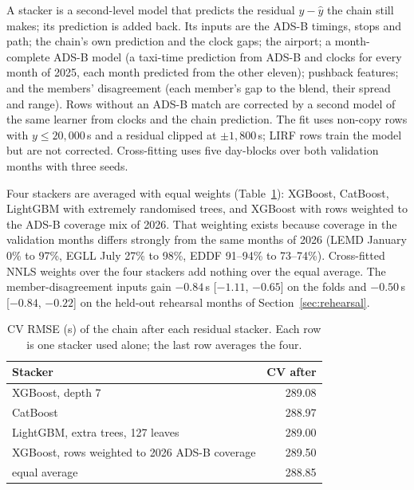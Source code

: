 \documentclass[
  manuscript=article,
  layout=preprint,
  year=2026,
  volume=x,
]{extra/joas}
\begin{document}
A stacker \cite{wolpert1992stacked} is a second-level model that predicts the residual $y - \hat{y}$ the chain still makes; its
prediction is added back. Its inputs are the ADS-B timings, stops and path; the chain's own prediction and the clock gaps; the airport;
a month-complete ADS-B model (a taxi-time prediction from ADS-B and clocks for every month of 2025, each month predicted from the other
eleven); pushback features; and the members' disagreement (each member's gap to the blend, their spread and range). Rows without an ADS-B
match are corrected by a second model of the same learner from clocks and the chain prediction. The fit uses non-copy rows with
$y \le 20{,}000$\,s and a residual clipped at $\pm 1{,}800$\,s; LIRF rows train the model but are not corrected. Cross-fitting uses five
day-blocks over both validation months with three seeds.

Four stackers are averaged with equal weights (Table~\ref{tb:stackers}): XGBoost, CatBoost, LightGBM \cite{ke2017lightgbm} with extremely
randomised trees, and XGBoost with rows weighted to the ADS-B coverage mix of 2026. That weighting exists because coverage in the
validation months differs strongly from the same months of 2026 (LEMD January 0\% to 97\%, EGLL July 27\% to 98\%, EDDF 91--94\% to
73--74\%). Cross-fitted NNLS weights over the four stackers add nothing over the equal average. The member-disagreement inputs gain
$-0.84$\,s [$-1.11$, $-0.65$] on the folds and $-0.50$\,s [$-0.84$, $-0.22$] on the held-out rehearsal months of
Section~\ref{sec:rehearsal}.

\begin{table}[htbp!]
  \centering
  \small
  \caption{CV RMSE (s) of the chain after each residual stacker. Each row is one stacker used alone; the last row averages the four.}
  \label{tb:stackers}
  \begin{tabular}{lr}
  \toprule
  \textbf{Stacker} & \textbf{CV after} \\
  \midrule
  XGBoost, depth 7 & 289.08 \\
  CatBoost & 288.97 \\
  LightGBM, extra trees, 127 leaves & 289.00 \\
  XGBoost, rows weighted to 2026 ADS-B coverage & 289.50 \\
  equal average & 288.85 \\
  \bottomrule
  \end{tabular}
\end{table}
\end{document}
